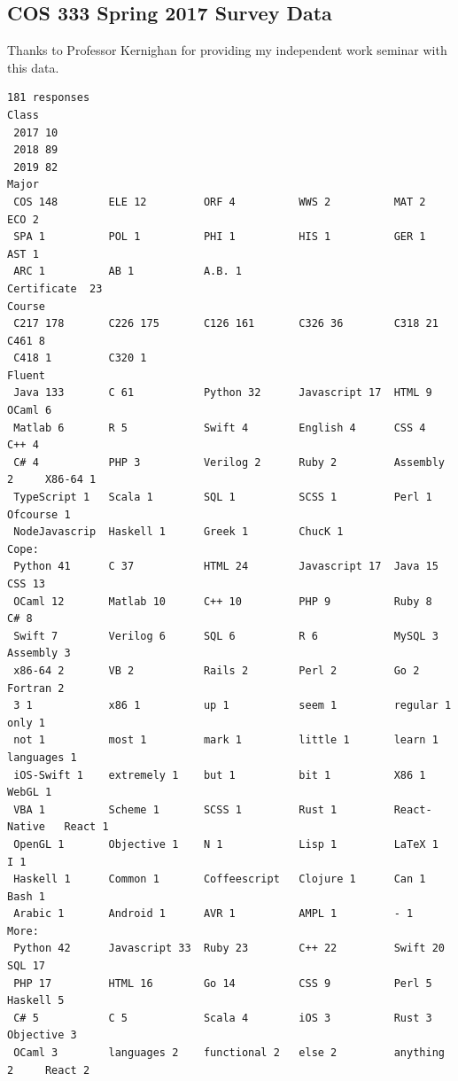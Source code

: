 \documentclass[pageno]{jpaper}
\begin{document}
\begin{appendices}
\section{COS 333 Spring 2017 Survey Data}\label{appendix:cos333sp17}
Thanks to Professor Kernighan for providing my independent work seminar with this data.
\begin{Verbatim}[fontsize=\scriptsize]
181 responses
Class
 2017 10
 2018 89
 2019 82
Major
 COS 148        ELE 12         ORF 4          WWS 2          MAT 2          ECO 2         
 SPA 1          POL 1          PHI 1          HIS 1          GER 1          AST 1         
 ARC 1          AB 1           A.B. 1        
Certificate  23
Course
 C217 178       C226 175       C126 161       C326 36        C318 21        C461 8        
 C418 1         C320 1        
Fluent
 Java 133       C 61           Python 32      Javascript 17  HTML 9         OCaml 6       
 Matlab 6       R 5            Swift 4        English 4      CSS 4          C++ 4         
 C# 4           PHP 3          Verilog 2      Ruby 2         Assembly 2     X86-64 1      
 TypeScript 1   Scala 1        SQL 1          SCSS 1         Perl 1         Ofcourse 1    
 NodeJavascrip  Haskell 1      Greek 1        ChucK 1       
Cope:
 Python 41      C 37           HTML 24        Javascript 17  Java 15        CSS 13        
 OCaml 12       Matlab 10      C++ 10         PHP 9          Ruby 8         C# 8          
 Swift 7        Verilog 6      SQL 6          R 6            MySQL 3        Assembly 3    
 x86-64 2       VB 2           Rails 2        Perl 2         Go 2           Fortran 2     
 3 1            x86 1          up 1           seem 1         regular 1      only 1        
 not 1          most 1         mark 1         little 1       learn 1        languages 1   
 iOS-Swift 1    extremely 1    but 1          bit 1          X86 1          WebGL 1       
 VBA 1          Scheme 1       SCSS 1         Rust 1         React-Native   React 1       
 OpenGL 1       Objective 1    N 1            Lisp 1         LaTeX 1        I 1           
 Haskell 1      Common 1       Coffeescript   Clojure 1      Can 1          Bash 1        
 Arabic 1       Android 1      AVR 1          AMPL 1         - 1           
More:
 Python 42      Javascript 33  Ruby 23        C++ 22         Swift 20       SQL 17        
 PHP 17         HTML 16        Go 14          CSS 9          Perl 5         Haskell 5     
 C# 5           C 5            Scala 4        iOS 3          Rust 3         Objective 3   
 OCaml 3        languages 2    functional 2   else 2         anything 2     React 2       

\end{Verbatim}
\end{appendices}
\end{document}
